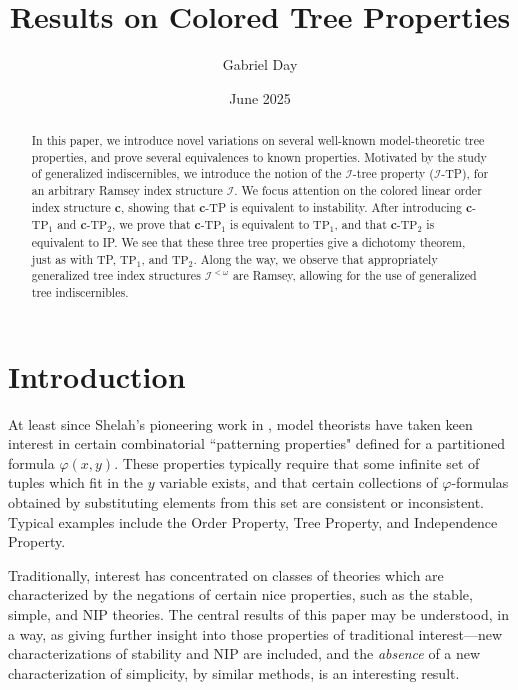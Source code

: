 \documentclass{article}
\title{Results on Colored Tree Properties}
\author{Gabriel Day}
\date{June 2025}
\newcommand{\calI}{\mathcal{I}}
\newcommand{\TPi}{\text{TP}_1}
\newcommand{\TPii}{\text{TP}_2}
\newcommand{\vphi}{\varphi}
\theoremstyle{definition}
\theoremstyle{definition}
\theoremstyle{definition}
\theoremstyle{definition}
\begin{document}
\maketitle

\begin{abstract}
    In this paper, we introduce novel variations on several well-known model-theoretic tree properties, and prove several equivalences to known properties. Motivated by the study of generalized indiscernibles, we introduce the notion of the $\calI$-tree property ($\calI$-TP), for an arbitrary Ramsey index structure $\calI$. We focus attention on the colored linear order index structure \textbf{c}, showing that \textbf{c}-TP is equivalent to instability. After introducing \textbf{c}-$\TPi$ and \textbf{c}-$\TPii$, we prove that \textbf{c}-$\TPi$ is equivalent to $\TPi$, and that \textbf{c}-$\TPii$ is equivalent to IP. We see that these three tree properties give a dichotomy theorem, just as with TP, $\TPi$, and $\TPii$. Along the way, we observe that appropriately generalized tree index structures $\calI^{<\omega}$ are Ramsey, allowing for the use of generalized tree indiscernibles.
    
\end{abstract}


\section{Introduction}

At least since Shelah's pioneering work in \cite{shelah_classification_1990}, model theorists have taken keen interest in certain combinatorial ``patterning properties" defined for a partitioned formula $\vphi(x,y)$. These properties typically require that some infinite set of tuples which fit in the $y$ variable exists, and that certain collections of $\vphi$-formulas obtained by substituting elements from this set are consistent or inconsistent. Typical examples include the Order Property, Tree Property, and Independence Property. 

Traditionally, interest has concentrated on classes of theories which are characterized by the negations of certain nice properties, such as the stable, simple, and NIP theories. The central results of this paper may be understood, in a way, as giving further insight into those properties of traditional interest---new characterizations of stability and NIP are included, and the \textit{absence} of a new characterization of simplicity, by similar methods, is an interesting result.
\end{document}
